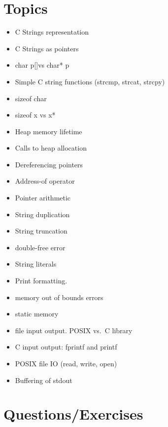 \section{Topics}

\begin{itemize}
	\tightlist
	\item
	      C Strings representation
	\item
	      C Strings as pointers
	\item
	      char p{[}{]}vs char* p
	\item
	      Simple C string functions (strcmp, strcat, strcpy)
	\item
	      sizeof char
	\item
	      sizeof x vs x*
	\item
	      Heap memory lifetime
	\item
	      Calls to heap allocation
	\item
	      Dereferencing pointers
	\item
	      Address-of operator
	\item
	      Pointer arithmetic
	\item
	      String duplication
	\item
	      String truncation
	\item
	      double-free error
	\item
	      String literals
	\item
	      Print formatting.
	\item
	      memory out of bounds errors
	\item
	      static memory
	\item
	      file input output. POSIX vs.~C library
	\item
	      C input output: fprintf and printf
	\item
	      POSIX file IO (read, write, open)
	\item
	      Buffering of stdout
\end{itemize}

\section{Questions/Exercises}

